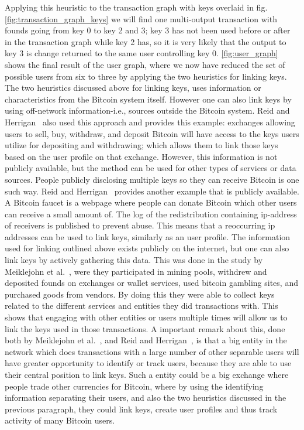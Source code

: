 Applying this heuristic to the transaction graph with keys overlaid in fig.\ref{fig:transaction_graph_keys} we will find one multi-output transaction with founds going from key 0 to key 2 and 3; key 3 has not been used before or after in the transaction graph while key 2 has, so it is very likely that the output to key 3 is change returned to the same user controlling key 0. \cref{fig:user_graph} shows the final result of the user graph, where we now have reduced the set of possible users from six to three by applying the two heuristics for linking keys.
\\

The two heuristics discussed above for linking keys, uses information or characteristics from the Bitcoin system itself. However one can also link keys by using off-network information-i.e., sources outside the Bitcoin system.
Reid and Herrigan~\cite{reid2013analysis} also used this approach and provides this example: exchanges allowing users to sell, buy, withdraw, and deposit Bitcoin will have access to the keys users utilize for depositing and withdrawing; which allows them to link those keys based on the user profile on that exchange. However, this information is not publicly available, but the method can be used for other types of services or data sources. People publicly disclosing multiple keys so they can receive Bitcoin is one such way. Reid and Herrigan~\cite{reid2013analysis} provides another example that is publicly available. A Bitcoin faucet is a webpage where people can donate Bitcoin which other users can receive a small amount of. The log of the redistribution containing ip-address of receivers is published to prevent abuse. This means that a reoccurring ip addresses can be used to link keys, similarly as an user profile. The information used for linking outlined above exists publicly on the internet, but one can also link keys by actively gathering this data. This was done in the study by Meiklejohn et al.~\cite{meiklejohn2013fistful}, were they participated in mining pools, withdrew and deposited founds on exchanges or wallet services, used bitcoin gambling sites, and purchased goods from vendors. By doing this they were able to collect keys related to the different services and entities they did transactions with. 
This shows that engaging with other entities or users multiple times will allow us to link the keys used in those transactions.
A important remark about this, done both by Meiklejohn et al.~\cite{meiklejohn2013fistful}, and Reid and Herrigan~\cite{reid2013analysis}, is that a big entity in the network which does transactions with a large number of other separable users will have greater opportunity to identify or track users, because they are able to use their central position to link keys. Such a entity could be a big exchange where people trade other currencies for Bitcoin, where by using the identifying information separating their users, and also the two heuristics discussed in the previous paragraph, they could link keys, create user profiles and thus track activity of many Bitcoin users.
\\

